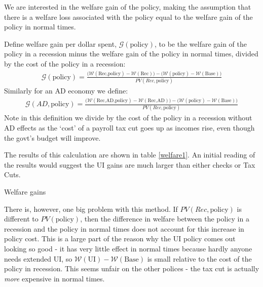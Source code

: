\documentclass[11pt]{article}
\begin{document}
	We are interested in the welfare gain of the policy, making the assumption that there is a welfare loss associated with the policy equal to the welfare gain of the policy in normal times.
	
	Define welfare gain per dollar spent, $\mathcal{G}(\text{policy})$, to be the welfare gain of the policy in a recession minus the welfare gain of the policy in normal times, divided by the cost of the policy in a recession:
	\begin{align}
		\mathcal{G}(\text{policy}) = \frac{\big(\mathcal{W}(\text{Rec,policy}) - \mathcal{W}(\text{Rec})\big)  - \big(\mathcal{W}(\text{policy}) - \mathcal{W}(\text{Base})\big) }{PV(Rec,\text{policy})}
	\end{align}
	Similarly for an AD economy we define:
	\begin{align}
	\mathcal{G}(AD,\text{policy}) = \frac{\big(\mathcal{W}(\text{Rec,AD,policy}) - \mathcal{W}(\text{Rec,AD})\big)  - \big(\mathcal{W}(\text{policy}) - \mathcal{W}(\text{Base})\big) }{PV(Rec,\text{policy})}
	\end{align}
	Note in this definition we divide by the cost of the policy in a recession without AD effects as the `cost' of a payroll tax cut goes up as incomes rise, even though the govt's budget will improve.
	
	The results of this calculation are shown in table \ref{welfare1}. An initial reading of the results would suggest the UI gains are much larger than either checks or Tax Cuts.
	\begin{table} 
		\center
		
		\caption{Welfare gains}
		\label{welfare1}
	\end{table}
	There is, however, one big problem with this method. If $PV(Rec,\text{policy})$ is different to $PV(\text{policy})$, then the difference in welfare between the policy in a recession and the policy in normal times does not account for this increase in policy cost. This is a large part of the reason why the UI policy comes out looking so good - it has very little effect in normal times because hardly anyone needs extended UI, so $\mathcal{W}(\text{UI}) - \mathcal{W}(\text{Base})$ is small relative to the cost of the policy in recession. This seems unfair on the other polices - the tax cut is actually \textit{more} expensive in normal times.
	
\end{document}
